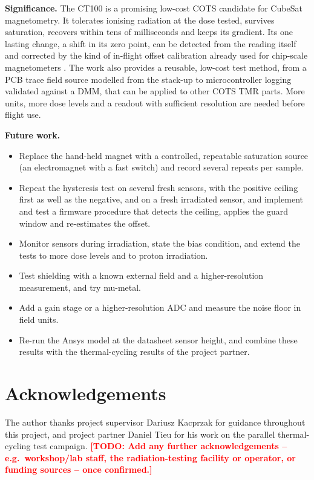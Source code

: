 \documentclass[12pt,a4paper]{article}
\newcommand{\todo}[1]{\textcolor{red}{\textbf{[TODO: #1]}}}
\begin{document}
\textbf{Significance.} The CT100 is a promising low-cost COTS candidate for CubeSat magnetometry. It tolerates ionising radiation at the dose tested, survives saturation, recovers within tens of milliseconds and keeps its gradient. Its one lasting change, a shift in its zero point, can be detected from the reading itself and corrected by the kind of in-flight offset calibration already used for chip-scale magnetometers \cite{archer2015}. The work also provides a reusable, low-cost test method, from a PCB trace field source modelled from the stack-up to microcontroller logging validated against a DMM, that can be applied to other COTS TMR parts. More units, more dose levels and a readout with sufficient resolution are needed before flight use.

\textbf{Future work.}
\begin{itemize}
\item Replace the hand-held magnet with a controlled, repeatable saturation source (an electromagnet with a fast switch) and record several repeats per sample.
\item Repeat the hysteresis test on several fresh sensors, with the positive ceiling first as well as the negative, and on a fresh irradiated sensor, and implement and test a firmware procedure that detects the ceiling, applies the guard window and re-estimates the offset.
\item Monitor sensors during irradiation, state the bias condition, and extend the tests to more dose levels and to proton irradiation.
\item Test shielding with a known external field and a higher-resolution measurement, and try mu-metal.
\item Add a gain stage or a higher-resolution ADC and measure the noise floor in field units.
\item Re-run the Ansys model at the datasheet sensor height, and combine these results with the thermal-cycling results of the project partner.
\end{itemize}

\clearpage

\section*{Acknowledgements}

The author thanks project supervisor Dariusz Kacprzak for guidance throughout this project, and project partner Daniel Tieu for his work on the parallel thermal-cycling test campaign. \todo{Add any further acknowledgements -- e.g.\ workshop/lab staff, the radiation-testing facility or operator, or funding sources -- once confirmed.}
\end{document}
